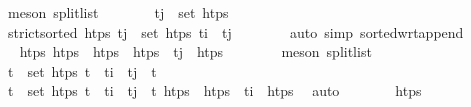 \begin{isabellebody}
\ {\isacharparenleft}{\kern0pt}meson\ split{\isacharunderscore}{\kern0pt}list{\isacharparenright}{\kern0pt}\isanewline
\ \ \ \ \isamarkupfalse%
\ \isamarkupfalse%
\ {\isachardoublequoteopen}t\isactrlsub j\ {\isasymin}\ set\ htps\isanewline
\ \ \ \ \ \ \isamarkupfalse%
\ {\isacartoucheopen}strict{\isacharunderscore}{\kern0pt}sorted\ htps{\isacartoucheclose}\ {\isacartoucheopen}t\isactrlsub j\ {\isasymin}\ set\ htps{\isacartoucheclose}\ {\isacartoucheopen}t\isactrlsub i\ {\isacharless}{\kern0pt}\ t\isactrlsub j{\isacartoucheclose}\isanewline
\ \ \ \ \ \ \isamarkupfalse%
\ {\isacharparenleft}{\kern0pt}auto\ simp{\isacharcolon}{\kern0pt}\ sorted{\isacharunderscore}{\kern0pt}wrt{\isacharunderscore}{\kern0pt}append{\isacharparenright}{\kern0pt}\isanewline
\ \ \ \ \isamarkupfalse%
\ \isamarkupfalse%
\ htps\ htps\ \ {\isachardoublequoteopen}htps\ {\isacharequal}{\kern0pt}\ htps\ {\isacharat}{\kern0pt}\ t\isactrlsub j\ {\isacharhash}{\kern0pt}\ htps\isanewline
\ \ \ \ \ \ \isamarkupfalse%
\ {\isacharparenleft}{\kern0pt}meson\ split{\isacharunderscore}{\kern0pt}list{\isacharparenright}{\kern0pt}\isanewline
\ \ \ \ \isamarkupfalse%
\ \isamarkupfalse%
\ {\isachardoublequoteopen}{\isasymforall}t\ {\isasymin}\ set\ htps\ t\ {\isasymle}\ t\isactrlsub i\ {\isasymor}\ t\isactrlsub j\ {\isasymle}\ t{\isachardoublequoteclose}\isanewline
\ \ \ \ \ \ \isamarkupfalse%
\ {\isacartoucheopen}{\isasymforall}t\ {\isasymin}\ set\ htps{\isachardot}{\kern0pt}\ t\ {\isasymle}\ t\isactrlsub i\ {\isasymor}\ t\isactrlsub j\ {\isasymle}\ t{\isacartoucheclose}\ {\isacartoucheopen}htps\ {\isacharequal}{\kern0pt}\ htps\ {\isacharat}{\kern0pt}\ t\isactrlsub i\ {\isacharhash}{\kern0pt}\ htps\ \isamarkupfalse%
\ auto\isanewline
\ \ \ \ \isamarkupfalse%
\ \isamarkupfalse%
\ {\isachardoublequoteopen}htps\ {\isacharequal}{\kern0pt}\ {\isacharbrackleft}{\kern0pt}{\isacharbrackright}{\kern0pt}{\isachardoublequoteclose}\isanewline

\end{isabellebody}
